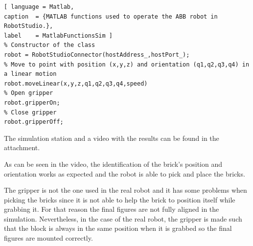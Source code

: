 \begin{lstlisting}[ language = Matlab,
caption  = {MATLAB functions used to operate the ABB robot in RobotStudio.},
label    = MatlabFunctionsSim ]
% Constructor of the class
robot = RobotStudioConnector(hostAddress_,hostPort_);
% Move to point with position (x,y,z) and orientation (q1,q2,q3,q4) in a linear motion
robot.moveLinear(x,y,z,q1,q2,q3,q4,speed)
% Open gripper
robot.gripperOn;
% Close gripper
robot.gripperOff;
\end{lstlisting}

The simulation station and a video with the results can be found in the attachment.

As can be seen in the video, the identification of the brick's position and orientation works as expected and the robot is able to pick and place the bricks. 

The gripper is not the one used in the real robot and it has some problems when picking the bricks since it is not able to help the brick to position itself while grabbing it. For that reason the final figures are not fully aligned in the simulation. Nevertheless, in the case of the real robot, the gripper is made such that the block is always in the same position when it is grabbed so the final figures are mounted correctly.
